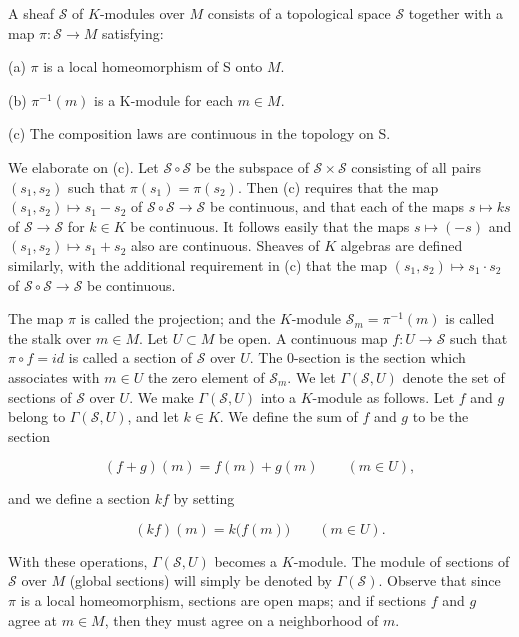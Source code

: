 \begin{definition}\label{thm:5.1}
A sheaf $\mathcal{S}$ of $K$-modules over $M$ consists of a topological space $\mathcal{S}$ together with a map $\pi\colon \mathcal{S} \to M$ satisfying:

(a)  $ \pi $ is a local homeomorphism of S onto  $ M $.

(b)  $ \pi^{-1}(m) $ is a K-module for each  $ m \in M $.

(c) The composition laws are continuous in the topology on S.

We elaborate on (c). Let $\mathcal{S}\circ\mathcal{S}$ be the subspace of $\mathcal{S}\times\mathcal{S}$ consisting of all pairs $(s_1,s_2)$ such that $\pi(s_1)=\pi(s_2)$. Then (c) requires that the map $(s_1,s_2)\mapsto s_1-s_2$ of $\mathcal{S}\circ\mathcal{S}\to\mathcal{S}$ be continuous, and that each of the maps $s\mapsto k s$ of $\mathcal{S}\to\mathcal{S}$ for $k\in K$ be continuous. It follows easily that the maps $s\mapsto(-s)$ and $(s_1,s_2)\mapsto s_1+s_2$ also are continuous. Sheaves of $K$ algebras are defined similarly, with the additional requirement in (c) that the map $(s_1,s_2)\mapsto s_1\cdot s_2$ of $\mathcal{S}\circ\mathcal{S}\to\mathcal{S}$ be continuous.

The map $\pi$ is called the projection; and the $K$-module $\mathcal{S}_m = \pi^{-1}(m)$ is called the stalk over $m \in M$. Let $U \subset M$ be open. A continuous map $f: U \to \mathcal{S}$ such that $\pi \circ f = id$ is called a section of $\mathcal{S}$ over $U$. The 0-section is the section which associates with $m \in U$ the zero element of $\mathcal{S}_m$. We let $\Gamma(\mathcal{S}, U)$ denote the set of sections of $\mathcal{S}$ over $U$. We make $\Gamma(\mathcal{S}, U)$ into a $K$-module as follows. Let $f$ and $g$ belong to $\Gamma(\mathcal{S}, U)$, and let $k \in K$. We define the sum of $f$ and $g$ to be the section

\[
(f+g)(m)=f(m)+g(m)\qquad(m\in U),
\]

and we define a section $kf$ by setting

\[
(k f)(m)=k\bigl(f(m)\bigr)\qquad(m\in U).
\]

With these operations, $\Gamma(\mathcal{S},U)$ becomes a $K$-module. The module of sections of $\mathcal{S}$ over $M$ (global sections) will simply be denoted by $\Gamma(\mathcal{S})$. Observe that since $\pi$ is a local homeomorphism, sections are open maps; and if sections $f$ and $g$ agree at $m\in M$, then they must agree on a neighborhood of $m$.

\end{definition}

